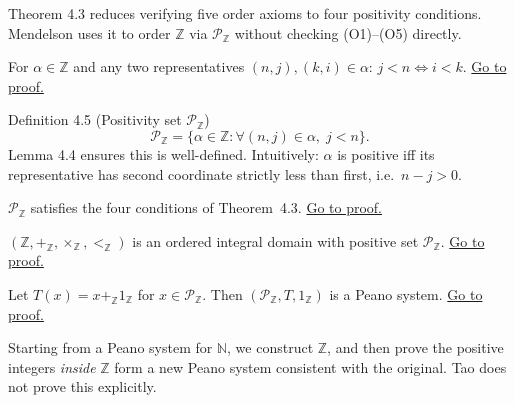 \begin{remark*}
Theorem 4.3 reduces verifying five order axioms to four positivity
conditions.  Mendelson uses it to order $\mathbb{Z}$ via
$\mathcal{P}_\mathbb{Z}$ without checking (O1)--(O5) directly.
\end{remark*}

\begin{lemma}
\label{lem:men-positivity-class-invariant}
For $\alpha\in\mathbb{Z}$ and any two representatives
$(n,j),(k,i)\in\alpha$: $j<n \iff i<k$.
\hyperref[prf:men-positivity-class-invariant]{Go to proof.}
\end{lemma}

\begin{corollarybox}{Definition 4.5 (Positivity set $\mathcal{P}_{\mathbb{Z}}$)}
\[
\mathcal{P}_{\mathbb{Z}}
= \bigl\{\alpha\in\mathbb{Z}
: \forall(n,j)\in\alpha,\; j<n \bigr\}.
\]
Lemma 4.4 ensures this is well-defined.
Intuitively: $\alpha$ is positive iff its representative has
second coordinate strictly less than first, i.e.\ $n-j > 0$.
\end{corollarybox}

\begin{lemma}[Mendelson 4.5]
\label{lem:men-positive-set-conditions}
$\mathcal{P}_\mathbb{Z}$ satisfies the four conditions of Theorem~4.3.
\hyperref[prf:men-positive-set-conditions]{Go to proof.}
\end{lemma}

\begin{corollary}[Mendelson 4.6]
\label{cor:men-integers-ordered-integral-domain}
$(\mathbb{Z},+_\mathbb{Z},\times_\mathbb{Z},<_\mathbb{Z})$ is an
ordered integral domain with positive set $\mathcal{P}_\mathbb{Z}$.
\hyperref[prf:men-integers-ordered-integral-domain]{Go to proof.}
\end{corollary}

\begin{theorem}
\label{thm:men-positive-integers-form-peano-system}
Let $T(x)=x+_\mathbb{Z}1_\mathbb{Z}$ for $x\in\mathcal{P}_\mathbb{Z}$.
Then $(\mathcal{P}_\mathbb{Z},T,1_\mathbb{Z})$ is a Peano system.
\hyperref[prf:men-positive-integers-form-peano-system]{Go to proof.}
\end{theorem}

\begin{remark*}[Significance]
Starting from a Peano system for $\mathbb{N}$, we construct $\mathbb{Z}$,
and then prove the positive integers \emph{inside} $\mathbb{Z}$ form a
new Peano system consistent with the original.
Tao does not prove this explicitly.
\end{remark*}

